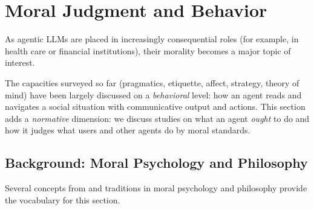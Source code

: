 


\section{Moral Judgment and Behavior} \label{sec:moral}
As agentic LLMs are placed in increasingly consequential roles (for example, in health care or financial institutions), their morality becomes a major topic of interest. 

The capacities surveyed so far (pragmatics, etiquette, affect, strategy, theory of mind) have been largely discussed on a \emph{behavioral} level: how an agent reads and navigates a social situation with communicative output and actions. This section adds a \emph{normative} dimension: we discuss studies on what an agent \emph{ought} to do and how it judges what users and other agents do by moral standards. 

\subsection{Background: Moral Psychology and Philosophy}
Several concepts from and traditions in moral psychology and philosophy provide the vocabulary for this section. 

